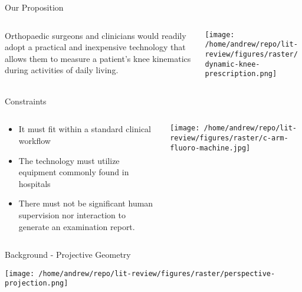 \documentclass[presentation, aspectratio=1610]{beamer}
\begin{document}
\begin{frame}[label={sec:orgb5a3f94}]{Our Proposition}
\begin{columns}
\begin{column}{0.5\columnwidth}
Orthopaedic surgeons and clinicians would readily adopt a \alert{\alert{practical}} and \alert{\alert{inexpensive}} technology that allows them to \alert{\alert{measure}} a patient's knee kinematics during \alert{\alert{activities of daily living}}.
\end{column}
\begin{column}{0.55\columnwidth}
\begin{center}
\texttt{[image: /home/andrew/repo/lit-review/figures/raster/dynamic-knee-prescription.png]}
\end{center}
\end{column}
\end{columns}
\end{frame}
\begin{frame}[label={sec:org2f73695}]{Constraints}
\begin{columns}
\begin{column}{0.45\columnwidth}
\begin{itemize}
\item It must fit within a \alert{\alert{standard clinical workflow}}
\item The technology must utilize equipment \alert{\alert{commonly found in hospitals}}
\item There must not be significant \alert{\alert{human supervision}} nor interaction to generate an examination report.
\end{itemize}
\end{column}
\begin{column}{0.55\columnwidth}
\begin{center}
\texttt{[image: /home/andrew/repo/lit-review/figures/raster/c-arm-fluoro-machine.jpg]}
\end{center}
\end{column}
\end{columns}
\end{frame}
\begin{frame}[label={sec:orgc4cfa3a}]{Background - Projective Geometry}
\begin{center}
\texttt{[image: /home/andrew/repo/lit-review/figures/raster/perspective-projection.png]}
\end{center}
\end{frame}
\end{document}
